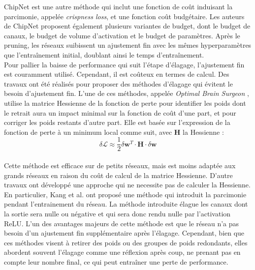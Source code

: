 ChipNet  \cite{tiwari2021chipnet} est une autre méthode qui inclut une fonction
de coût induisant la parcimonie, appelée \emph{crispness loss}, et une fonction
coût budgétaire. Les auteurs de ChipNet proposent également plusieurs variantes
de budget, dont le budget de canaux, le budget de volume d'activation et le
budget de paramètres. Après le pruning, les réseaux suibissent un ajustement fin
avec les mêmes hyperparamètres que l'entraînement initial, doublant ainsi le
temps d'entraînement.\\

Pour pallier la baisse de performance qui suit l'étape d'élagage, l'ajustement
fin est couramment utilisé. Cependant, il est coûteux en termes de calcul. Des
travaux ont été réalisés pour proposer des méthodes d'élagage qui évitent le
besoin d'ajustement fin. L'une de ces méthodes, appelée \emph{Optimal Brain
  Surgeon} \cite{DBLP:conf/icnn/HassibiSW93}, utilise la matrice Hessienne de la
fonction de perte pour identifier les poids dont le retrait aura un impact
minimal sur la fonction de coût d'une part, et pour corriger les poids restants
d'autre part. Elle est basée sur l'expression de la fonction de perte à un
minimum local comme suit, avec $\mathbf{H}$ la Hessienne :\\

\begin{equation}
  \delta \mathcal{L} \approx \frac{1}{2} \delta \mathbf{w}^T \cdot \mathbf{H} \cdot \delta \mathbf{w}
\end{equation}\\

Cette méthode est efficace sur de petits réseaux, mais est moins adaptée aux
grands réseaux en raison du coût de calcul de la matrice Hessienne. D'autre
travaux ont développé une approche qui ne necessite pas de calculer la
Hessienne. En particulier,  Kang et al. \cite{DBLP:conf/ijcai/HeKDFY18} ont
proposé une méthode qui introduit la parcimonie pendant l'entrainement du
réseau. La méthode introduite élague les canaux dont la sortie sera nulle ou
négative et qui sera donc rendu nulle par l'activation \ac{ReLU}. L'un des
avantages majeurs de cette méthode est que le réseau n'a pas besoin d'un
ajustement fin supplémentaire après l'élagage. Cependant, bien que ces méthodes
visent à retirer des poids ou des groupes de poids redondants, elles abordent
souvent l'élagage comme une réflexion après coup, ne prenant pas en compte leur
nombre final, ce qui peut entraîner une perte de performance.\\

